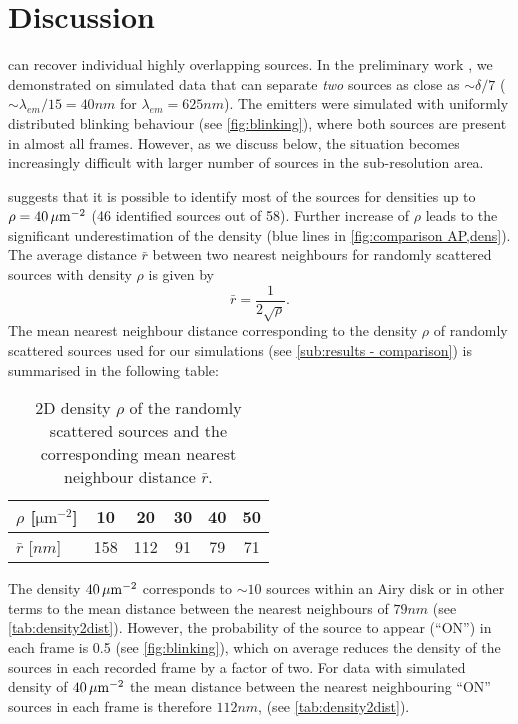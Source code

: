 
\clearpage
\section{Discussion\label{sec:Discussion}}

\inmf{} can recover individual highly overlapping sources. In the preliminary work \cite{Mandula2010b}, we demonstrated on simulated data that \inmf{} can separate \emph{two} sources as close as $\sim \delta/7$ ($\sim \lambda_{em}/15 = 40 \unit{nm}$ for $\lambda_{em}=625 \unit{nm}$). The emitters were simulated with uniformly distributed blinking behaviour (see \autoref{fig:blinking}\aaa), where both sources are present in almost all frames. However, as we discuss below, the situation becomes increasingly difficult with larger number of sources in the sub-resolution area.

 suggests that it is possible to identify most of the sources for densities up to $\rho=40\, \mathrm{\mu m}^{-2}$ (46 identified sources out of 58). Further increase of $\rho$ leads to the significant underestimation of the density (blue lines in \autoref{fig:comparison AP,dens}\aaa). The average distance $\bar{r}$ between two nearest neighbours for randomly scattered sources with density $\rho$ is given by \cite{Frieden1991}
%
\begin{equation}
	\bar{r}=\frac{1}{2\sqrt{\rho}}.
\end{equation}
%
The mean nearest neighbour distance corresponding to the density $\rho$ of randomly scattered sources used for our simulations (see \autoref{sub:results - comparison}) is summarised in the following table:
%
\begin{table}[!h]
	\centering
	\begin{tabular}{l|ccccc}
		$\rho$ [$\unit{\um^{-2}}$]		& 10		& 20		& 30		& 40		& 50\\ \hline
		$\bar{r}$ [$\unit{nm}$]		& 158	& 112	& 91		& 79		& 71
	\end{tabular}
	\caption{2D density $\rho$ of the randomly scattered sources and the corresponding mean nearest neighbour distance $\bar{r}$.\label{tab:density2dist}}
\end{table}

The density $40\, \mathrm{\mu m}^{-2}$ corresponds to $\sim 10$ sources within an Airy disk or in other terms to the mean distance between the nearest neighbours of $79\unit{nm}$ (see \autoref{tab:density2dist}). However, the probability of the source to appear (``ON'') in each frame is 0.5 (see \autoref{fig:blinking}\ddd), which on average reduces the density of the sources in each recorded frame by a factor of two. For data with simulated density of $40\, \mathrm{\mu m}^{-2}$ the mean distance between the nearest neighbouring ``ON'' sources in each frame is therefore $112 \unit{nm}$, (see \autoref{tab:density2dist}).  

